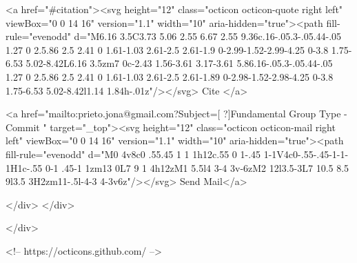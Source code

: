       <a  href="#citation"><svg height="12" class="octicon octicon-quote right left" viewBox="0 0 14 16" version="1.1" width="10" aria-hidden="true"><path fill-rule="evenodd" d="M6.16 3.5C3.73 5.06 2.55 6.67 2.55 9.36c.16-.05.3-.05.44-.05 1.27 0 2.5.86 2.5 2.41 0 1.61-1.03 2.61-2.5 2.61-1.9 0-2.99-1.52-2.99-4.25 0-3.8 1.75-6.53 5.02-8.42L6.16 3.5zm7 0c-2.43 1.56-3.61 3.17-3.61 5.86.16-.05.3-.05.44-.05 1.27 0 2.5.86 2.5 2.41 0 1.61-1.03 2.61-2.5 2.61-1.89 0-2.98-1.52-2.98-4.25 0-3.8 1.75-6.53 5.02-8.42l1.14 1.84h-.01z"/></svg> Cite
      </a>

      <a href="mailto:prieto.jona@gmail.com?Subject=[ ?]Fundamental Group Type - Commit " target="_top"><svg height="12" class="octicon octicon-mail right left" viewBox="0 0 14 16" version="1.1" width="10" aria-hidden="true"><path fill-rule="evenodd" d="M0 4v8c0 .55.45 1 1 1h12c.55 0 1-.45 1-1V4c0-.55-.45-1-1-1H1c-.55 0-1 .45-1 1zm13 0L7 9 1 4h12zM1 5.5l4 3-4 3v-6zM2 12l3.5-3L7 10.5 8.5 9l3.5 3H2zm11-.5l-4-3 4-3v6z"/></svg> Send Mail</a>

    </div>
  </div>

</div>

<!-- https://octicons.github.com/ -->





